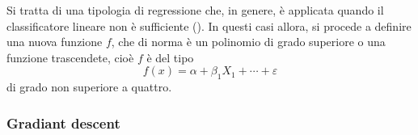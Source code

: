 \documentclass{subfiles}
\begin{document}
Si tratta di una tipologia di regressione che, in genere, è applicata quando il classificatore lineare non è sufficiente ().
In questi casi allora, si procede a definire una nuova funzione \(f\), che di norma è un polinomio di grado superiore o una funzione trascendete,
cioè \(f\) è del tipo
\[
    f(x) = \alpha + \beta_{1} X_{1} + \cdots + \varepsilon
\]
di grado non superiore a quattro.

\subsubsection{Gradiant descent}

\end{document}
